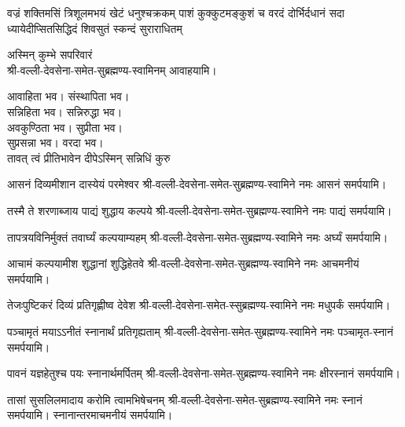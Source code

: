 {वज्रं शक्तिमसिं त्रिशूलमभयं खेटं धनुश्चक्रकम्}
{पाशं कुक्कुटमङ्कुशं च वरदं दोर्भिर्दधानं सदा}
{ध्यायेदीप्सितसिद्धिदं शिवसुतं स्कन्दं सुराराधितम्}

\nobreak%
अस्मिन् कुम्भे सपरिवारं\\
श्री-वल्ली-देवसेना-समेत-सुब्रह्मण्य-स्वामिनम् आवाहयामि। 

आवाहिता भव। संस्थापिता भव।\\
सन्निहिता भव। सन्निरुद्धा भव।\\
अवकुण्ठिता भव। सुप्रीता भव।\\
सुप्रसन्ना भव। वरदा भव।\\

{तावत् त्वं प्रीतिभावेन दीपेऽस्मिन् सन्निधिं कुरु}

{आसनं दिव्यमीशान दास्येयं परमेश्वर}
\nobreak%
श्री-वल्ली-देवसेना-समेत-सुब्रह्मण्य-स्वामिने
नमः आसनं समर्पयामि।

{तस्मै ते शरणाब्जाय पाद्यं शुद्धाय कल्पये}
\nobreak%
श्री-वल्ली-देवसेना-समेत-सुब्रह्मण्य-स्वामिने
नमः पाद्यं समर्पयामि।

{तापत्रयविनिर्मुक्तं तवार्घ्यं कल्पयाम्यहम्}
\nobreak%
 श्री-वल्ली-देवसेना-समेत-सुब्रह्मण्य-स्वामिने
 नमः अर्घ्यं समर्पयामि।

{आचामं कल्पयामीश शुद्धानां शुद्धिहेतवे}
\nobreak%
श्री-वल्ली-देवसेना-समेत-सुब्रह्मण्य-स्वामिने
नमः आचमनीयं समर्पयामि।

{तेजःपुष्टिकरं दिव्यं प्रतिगृह्णीष्व देवेश}
\nobreak%
श्री-वल्ली-देवसेना-समेत-स्सुब्रह्मण्य-स्वामिने
नमः मधुपर्कं समर्पयामि।

{पञ्चामृतं मयाऽऽनीतं स्नानार्थं प्रतिगृह्यताम्}
\nobreak%
श्री-वल्ली-देवसेना-समेत-सुब्रह्मण्य-स्वामिने
नमः पञ्चामृत-स्नानं समर्पयामि।

{पावनं यज्ञहेतुश्च पयः स्नानार्थमर्पितम्}
\nobreak%
श्री-वल्ली-देवसेना-समेत-सुब्रह्मण्य-स्वामिने
नमः क्षीरस्नानं समर्पयामि।

{तासां सुसलिलमादाय करोमि त्वामभिषेचनम्}
\nobreak%
श्री-वल्ली-देवसेना-समेत-सुब्रह्मण्य-स्वामिने
नमः स्नानं समर्पयामि। स्नानान्तरमाचमनीयं समर्पयामि।

